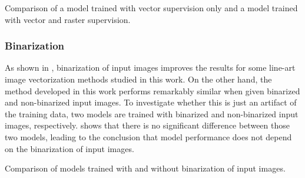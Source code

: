 \begin{table}[]
    \centering

    \caption{Comparison of a model trained with vector supervision only and a model trained with vector and raster supervision.}
    \label{tab:versions-loss}
\end{table}

\subsubsection{Binarization}

As shown in , binarization of input images improves the results for some line-art image vectorization methods studied in this work. On the other hand, the method developed in this work performs remarkably similar when given binarized and non-binarized input images. To investigate whether this is just an artifact of the training data, two models are trained with binarized and non-binarized input images, respectively.  shows that there is no significant difference between those two models, leading to the conclusion that model performance does not depend on the binarization of input images.

\begin{table}[]
    \centering

    \caption{Comparison of models trained with and without binarization of input images.}
    \label{tab:versions-binarization}
\end{table}